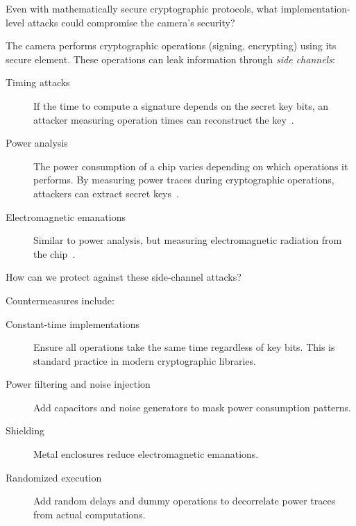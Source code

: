 
\begin{exercise}
  Even with mathematically secure cryptographic protocols, what 
  implementation-level attacks could compromise the camera's security?
\end{exercise}

The camera performs cryptographic operations (signing, encrypting) using its 
secure element.
These operations can leak information through \emph{side channels}:
\begin{description}
  \item[Timing attacks] If the time to compute a signature depends on the
    secret key bits, an attacker measuring operation times can reconstruct
    the key~\autocite{Kocher1996timing}.
  \item[Power analysis] The power consumption of a chip varies depending on
    which operations it performs.
    By measuring power traces during cryptographic operations, attackers
    can extract secret keys~\autocite{KocherJaffeJun1999dpa}.
  \item[Electromagnetic emanations] Similar to power analysis, but
    measuring electromagnetic radiation from the
    chip~\autocite{QuisquaterSamyde2001ema}.
\end{description}

\begin{exercise}
  How can we protect against these side-channel attacks?
\end{exercise}

Countermeasures include:
\begin{description}
  \item[Constant-time implementations] Ensure all operations take the
    same time regardless of key bits.
    This is standard practice in modern cryptographic libraries.
  \item[Power filtering and noise injection] Add capacitors and noise
    generators to mask power consumption patterns.
  \item[Shielding] Metal enclosures reduce electromagnetic emanations.
  \item[Randomized execution] Add random delays and dummy operations to
    decorrelate power traces from actual computations.
\end{description}

